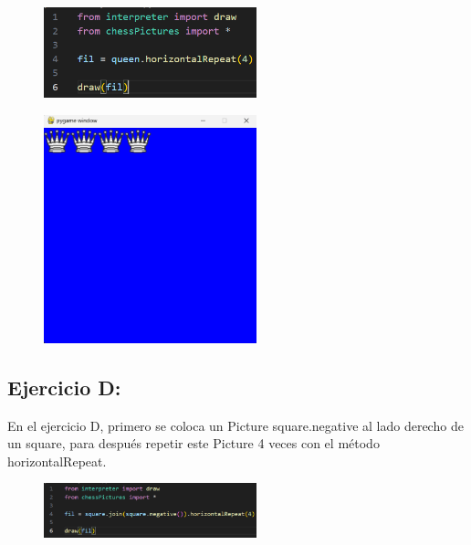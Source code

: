 \documentclass{article}
\begin{document}
	\begin{figure}[H]
		\centering
		\includegraphics[width=0.55\textwidth,keepaspectratio]{img/cap12.png}
	\end{figure}
	
	\begin{figure}[H]
		\centering
		\includegraphics[width=0.55\textwidth,keepaspectratio]{img/Picture C.png}
	\end{figure}	
	
	\subsection{Ejercicio D:}
	
	En el ejercicio D, primero se coloca un Picture square.negative al lado derecho de un square, para después repetir este Picture 4 veces con el método horizontalRepeat.
	
	\begin{figure}[H]
		\centering
		\includegraphics[width=0.55\textwidth,keepaspectratio]{img/cap13.png}
	\end{figure}
	
\end{document}
